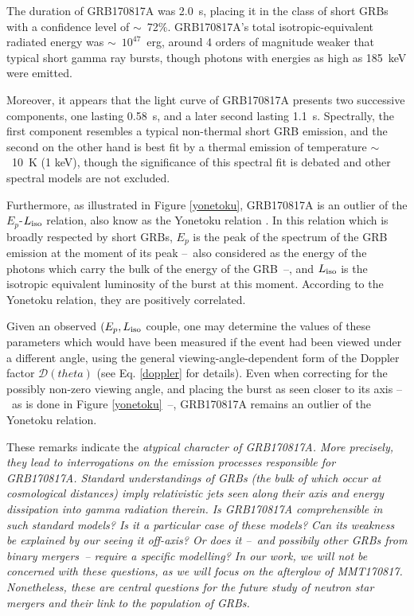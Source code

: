 The duration of GRB170817A was 2.0~s, placing it in the class of short GRBs with a confidence level of $\sim$~72\%. GRB170817A's total isotropic-equivalent radiated energy was $\sim$~$10^{47}$~erg, around 4 orders of magnitude weaker that typical short gamma ray bursts, though photons with energies as high as 185~keV were emitted.

Moreover, it appears that the light curve of GRB170817A presents two successive components, one lasting 0.58~s, and a later second lasting 1.1~s. Spectrally, the first component resembles a typical non-thermal short GRB emission, and the second on the other hand is best fit by a thermal emission of temperature $\sim$~10~K (1 keV), though the significance of this spectral fit is debated and other spectral models are not excluded.

Furthermore, as illustrated in Figure \ref{yonetoku}, GRB170817A is an outlier of the $E_p$-$L_{\rm{iso}}$ relation, also know as the Yonetoku relation \citep{35}. In this relation which is broadly respected by short GRBs, $E_p$ is the peak of the spectrum of the GRB emission at the moment of its peak --~also considered as the energy of the photons which carry the bulk of the energy of the GRB~--, and $L_{\rm{iso}}$ is the isotropic equivalent luminosity of the burst at this moment. According to the Yonetoku relation, they are positively correlated.

Given an observed $(E_p, L_{\rm{iso}}$ couple, one may determine the values of these parameters which would have been measured if the event had been viewed under a different angle, using the general viewing-angle-dependent form of the Doppler factor $\mathcal{D}(theta)$ (see Eq. \ref{doppler} for details). Even when correcting for the possibly non-zero viewing angle, and placing the burst as seen closer to its axis --~as is done in Figure \ref{yonetoku}~--, GRB170817A remains an outlier of the Yonetoku relation.


These remarks indicate the \it{atypical} character of GRB170817A. More precisely, they lead to interrogations on the emission processes responsible for GRB170817A. Standard understandings of GRBs (the bulk of which occur at cosmological distances) imply relativistic jets seen along their axis and energy dissipation into gamma radiation therein. Is GRB170817A comprehensible in such standard models? Is it a particular case of these models? Can its weakness be explained by our seeing it off-axis? Or does it --~and possibily other GRBs from binary mergers~-- require a specific modelling? In our work, we will not be concerned with these questions, as we will focus on the afterglow of MMT170817. Nonetheless, these are central questions for the future study of neutron star mergers and their link to the population of GRBs.

